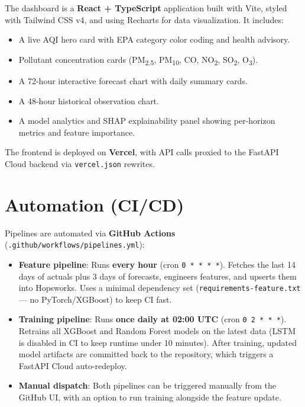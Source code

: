 \documentclass[12pt, a4paper]{article}
\begin{document}
The dashboard is a \textbf{React + TypeScript} application built with Vite, styled with Tailwind CSS v4, and using Recharts for data visualization.  It includes:

\begin{itemize}
  \item A live AQI hero card with EPA category color coding and health advisory.
  \item Pollutant concentration cards (PM\textsubscript{2.5}, PM\textsubscript{10}, CO, NO\textsubscript{2}, SO\textsubscript{2}, O\textsubscript{3}).
  \item A 72-hour interactive forecast chart with daily summary cards.
  \item A 48-hour historical observation chart.
  \item A model analytics and SHAP explainability panel showing per-horizon metrics and feature importance.
\end{itemize}

The frontend is deployed on \textbf{Vercel}, with API calls proxied to the FastAPI Cloud backend via \texttt{vercel.json} rewrites.


\section{Automation (CI/CD)}

Pipelines are automated via \textbf{GitHub Actions} (\texttt{.github/workflows/pipelines.yml}):

\begin{itemize}
  \item \textbf{Feature pipeline}: Runs \textbf{every hour} (cron \texttt{0 * * * *}).  Fetches the last 14 days of actuals plus 3 days of forecasts, engineers features, and upserts them into Hopsworks.  Uses a minimal dependency set (\texttt{requirements-feature.txt} --- no PyTorch/XGBoost) to keep CI fast.
  \item \textbf{Training pipeline}: Runs \textbf{once daily at 02:00 UTC} (cron \texttt{0 2 * * *}).  Retrains all XGBoost and Random Forest models on the latest data (LSTM is disabled in CI to keep runtime under 10 minutes).  After training, updated model artifacts are committed back to the repository, which triggers a FastAPI Cloud auto-redeploy.
  \item \textbf{Manual dispatch}: Both pipelines can be triggered manually from the GitHub UI, with an option to run training alongside the feature update.
\end{itemize}
\end{document}

